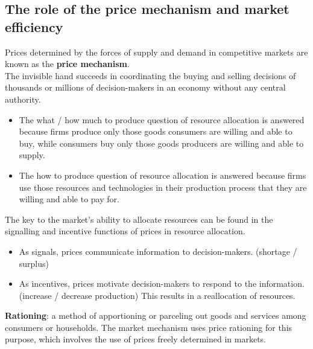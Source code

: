 \documentclass[a4paper,12pt]{article}
\newcommand{\needbold}[1]{\textcolor{red!70!black}{\textbf{#1}}}
\begin{document}
\subsection{The role of the price mechanism and market efficiency}
Prices determined by the forces of supply and demand in competitive markets are known as the \needbold{price mechanism}.\\
The invisible hand succeeds in coordinating the buying and selling decisions of thousands or millions of decision-makers in an economy without any central authority. 
\begin{itemize}
  \item The what / how much to produce question of resource allocation is answered because firms produce only those goods consumers are willing and able to buy, while consumers buy only those goods producers are willing and able to supply.
  \item The how to produce question of resource allocation is answered because firms use those resources and technologies in their production process that they are willing and able to pay for.
\end{itemize}
The key to the market's ability to allocate resources can be found in the signalling and incentive functions of prices in resource allocation. 
\begin{itemize}
  \item As signals, prices communicate information to decision-makers. (shortage / surplus)
  \item As incentives, prices motivate decision-makers to respond to the information. (increase / decrease production) This results in a reallocation of resources.
\end{itemize}
\needbold{Rationing}: a method of apportioning or parceling out goods and services among consumers or households. The market mechanism uses price rationing for this purpose, which involves the use of prices freely determined in markets.
\end{document}
